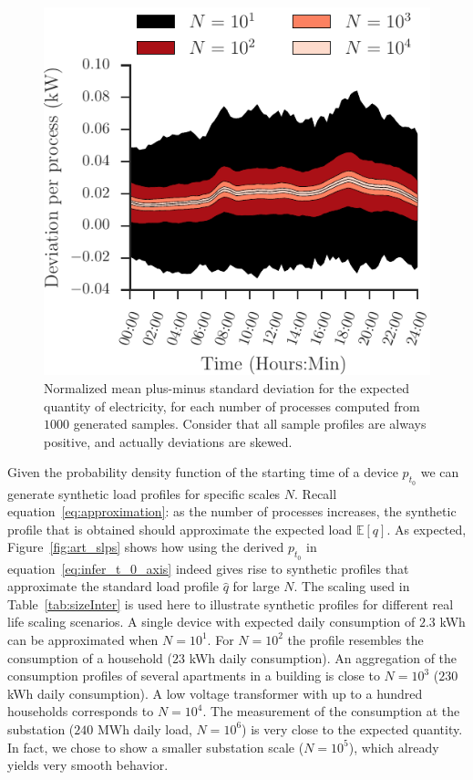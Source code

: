 \documentclass[conference]{IEEEtran}
\begin{document}
\begin{figure}[t!]
\centering
\includegraphics[width=0.9\columnwidth]{figures/std_.pdf}
\caption{Normalized mean plus-minus standard deviation for the expected quantity of electricity, for each number of processes computed from $1000$ generated samples. Consider that all sample profiles are always positive, and actually deviations are skewed.}
\label{fig:Deviation}
\end{figure}


Given the probability density function of the starting time of a device $p_{t_0}$ we can generate synthetic load profiles for specific scales $N$. Recall equation~\eqref{eq:approximation}: as the number of processes increases, the synthetic profile that is obtained should approximate the expected load $\mathbb{E}[q]$. As expected, Figure~\ref{fig:art_slps} shows how using the derived $p_{t_0}$ in equation~\eqref{eq:infer_t_0_axis} indeed gives rise to synthetic profiles that approximate the standard load profile $\hat{q}$ for large $N$. The scaling used in Table~\ref{tab:sizeInter} is used here to illustrate synthetic profiles for different real life scaling scenarios. A single device with expected daily consumption of $2.3$ kWh can be approximated when $N=10^1$. For $N=10^2$ the profile resembles the consumption of a household ($23$ kWh daily consumption). An aggregation of the consumption profiles of several apartments in a building is close to $N=10^3$ ($230$ kWh daily consumption). A low voltage transformer with up to a hundred households corresponds to $N=10^4$. The measurement of the consumption at the substation ($240$ MWh daily load, $N=10^6$) is very close to the expected quantity. In fact, we chose to show a smaller substation scale ($N=10^5$), which already yields very smooth behavior.
\end{document}
